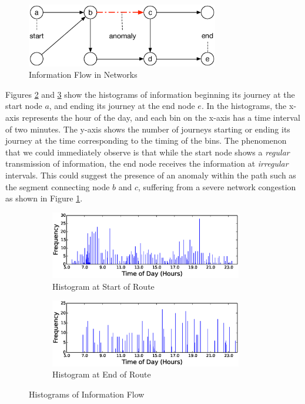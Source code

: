 \documentclass{sig-alternate}
\begin{document}
\begin{figure}[htb]
	\centering
	\includegraphics[width=3.3in]{travel_graph}
	\caption{Information Flow in Networks}
	\label{fig:travel_graph}
\end{figure}

Figures \ref{fig:7_start} and \ref{fig:7_end} show the histograms of information beginning its journey at the start node $a$, and ending its journey at the end node $e$. In the histograms, the x-axis represents the hour of the day, and each bin on the x-axis has a time interval of two minutes. The y-axis shows the number of journeys starting or ending its journey at the time corresponding to the timing of the bins. The phenomenon that we could immediately observe is that while the start node shows a \emph{regular} transmission of information, the end node receives the information at \emph{irregular} intervals. This could suggest the presence of an anomaly within the path such as the segment connecting node $b$ and $c$, suffering from a severe network congestion as shown in Figure \ref{fig:travel_graph}.

\begin{figure}[htb]
	\centering
	\begin{subfigure}{3.3in}
		\includegraphics[width=3.3in]{7_start} %
		\caption{Histogram at Start of Route}
		\label{fig:7_start}
	\end{subfigure}
	\begin{subfigure}{3.3in}
		\includegraphics[width=3.3in]{7_end} %
		\caption{Histogram at End of Route}
		\label{fig:7_end}
	\end{subfigure}
	\caption{Histograms of Information Flow}
	\label{fig:7}
\end{figure}
\end{document}
